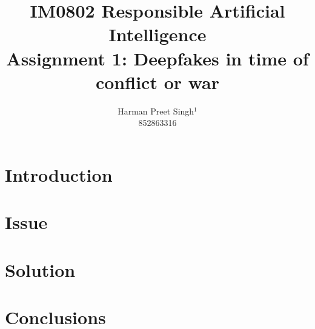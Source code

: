 \documentclass{article}
\title{IM0802 \textendash{} Responsible Artificial Intelligence \\ {\normalfont Assignment 1: Deepfakes in time of conflict or war}}
\author{%
Harman Preet Singh$^1$ \\[0.3em] 852863316 \\
}
\providecommand{\keywords}[1]
{
	\small
	\textbf{Keywords: } #1
}
\begin{document}
\maketitle


% 





\section{Introduction}
\label{sec:introduction}


\section{Issue}
\label{sec:issue}


\section{Solution}
\label{sec:solution}


\section{Conclusions}
\label{sec:conclusion}



% 


% 
\end{document}
